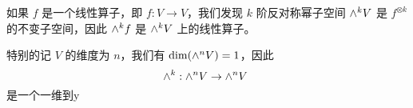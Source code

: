 
如果 $f$ 是一个线性算子，即 $f: V \to V$，我们发现 $k$ 阶反对称幂子空间 ${\large \wedge}^k V$ 是 $f^{\otimes k}$ 的不变子空间，因此 ${\large \wedge}^k f$ 是 ${\large \wedge}^k V$ 上的线性算子。

特别的记 $V$ 的维度为 $n$，我们有 $\dim({\large \wedge}^n V) = 1$，因此
\begin{equation}
{\large \wedge}^k: {\large \wedge}^n V \to {\large \wedge}^n V~
\end{equation}
是一个一维到y



